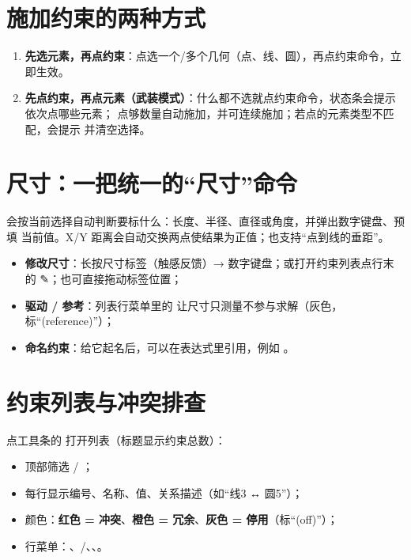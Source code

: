 \section{施加约束的两种方式}

\begin{enumerate}
  \item \textbf{先选元素，再点约束}：点选一个/多个几何（点、线、圆），再点约束命令，立即生效。
  \item \textbf{先点约束，再点元素（武装模式）}：什么都不选就点约束命令，状态条会提示依次点哪些元素；
        点够数量自动施加，并可连续施加；若点的元素类型不匹配，会提示 
        并清空选择。
\end{enumerate}

\section{尺寸：一把统一的“尺寸”命令}

 会按当前选择自动判断要标什么：长度、半径、直径或角度，并弹出数字键盘、预填
当前值。X/Y 距离会自动交换两点使结果为正值；也支持“点到线的垂距”。

\begin{itemize}
  \item \textbf{修改尺寸}：长按尺寸标签（触感反馈）→ 数字键盘；或打开约束列表点行末的 ✎；也可直接拖动标签位置；
  \item \textbf{驱动 / 参考}：列表行菜单里的  让尺寸只测量不参与求解（灰色，标“(reference)”）；
  \item \textbf{命名约束}：给它起名后，可以在表达式里引用，例如 。
\end{itemize}

\section{约束列表与冲突排查}

点工具条的  打开列表（标题显示约束总数）：

\begin{itemize}
  \item 顶部筛选  / ；
  \item 每行显示编号、名称、值、关系描述（如“线3 ↔ 圆5”）；
  \item 颜色：\textbf{红色 = 冲突}、\textbf{橙色 = 冗余}、\textbf{灰色 = 停用}（标“(off)”）；
  \item 行菜单：、/、、。
\end{itemize}

